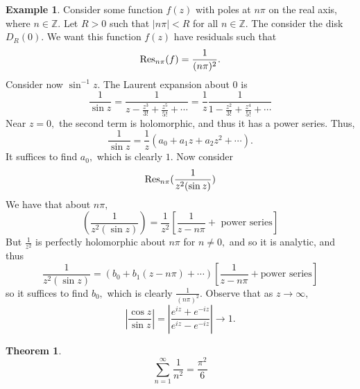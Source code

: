 \documentclass[10pt, oneside]{article}
\newcommand{\bbZ}{\mathbb{Z}}
\theoremstyle{definition}
\newtheorem{exmp}{Example}[section]
\newtheorem{thm}{Theorem}
\begin{document}
\begin{exmp}
    Consider some function $f(z)$ with poles at $n\pi$ on the real axis, where $n \in \bbZ.$ Let $R>0$ such that $|n \pi |< R$ for all $n \in \bbZ.$ The consider the disk $D_R(0).$ We want this function $f(z)$ have residuals such that 
    \[\Res_{n\pi}(f) = \frac{1}{(n\pi )^2}.\] Consider now $\sin^{-1} z.$ The Laurent expansion about $0$ is 
    \[\frac{1}{\sin z} = \frac{1}{z - \frac{z^3}{3!} + \frac{z^5}{5!} + \cdots } = \frac{1}{z}\frac{1}{1 - \frac{z^2}{3!} + \frac{z^4}{5!} + \cdots}\] Near $z = 0,$ the second term is holomorphic, and thus it has a power series. Thus, 
    \[\frac{1}{\sin z} = \frac{1}{z} (a_0 + a_1z + a_2z^2 + \cdots).\] It suffices to find $a_0,$ which is clearly $1.$ Now consider 
    \[\Res_{n \pi} (\frac{1}{z^2(\sin z)})\] We have that about $n\pi,$
    \[(\frac{1}{z^2(\sin z)})=\frac{1}{z^2}\left[ \frac{1}{z - n\pi} + \text{ power series}\right]\] But $\frac{1}{z^2}$ is perfectly holomorphic about $n\pi$ for $n \neq0,$ and so it is analytic, and thus 
    \[\frac{1}{z^2(\sin z)} = (b_0 + b_1(z- n\pi)+ \cdots)\left[\frac{1}{z - n\pi} + \text {power series}\right]\] so it suffices to find $b_0,$ which is clearly $\frac{1}{(n\pi)^2}.$ Observe that as $z\to \infty,$
    \[\left|\frac{\cos z}{\sin z}\right| = \left|\frac{e^{iz}+ e^{-iz}}{e^{iz} - e^{-iz}}\right|\to 1.\] 
\end{exmp}
\begin{thm}
    \[\sum_{n=1}^\infty \frac{1}{n^2} = \frac{\pi^2}{6}\]
\end{thm}
\end{document}
